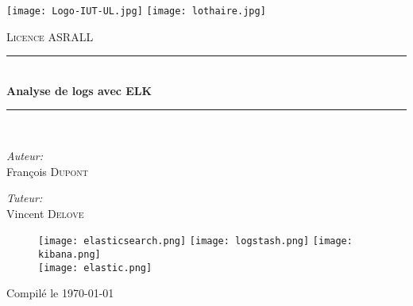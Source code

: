 \begin{titlepage}
\begin{center}
 \newcommand{\HRule}{\rule{\linewidth}{0.5mm}}

\texttt{[image: Logo-IUT-UL.jpg]}\hfill
\texttt{[image: lothaire.jpg]}
\vspace{1cm}

\textsc{\large Licence ASRALL}
\vspace{0.5cm}

\HRule \\[0.4cm]
{ \Large \bfseries Analyse de logs avec ELK\\[0.4cm] }

\HRule \\[1.0cm]

\noindent
\begin{minipage}{0.5\textwidth}
\begin{flushleft} \large
\emph{Auteur:}\\
François \textsc{Dupont}\\
\end{flushleft}
\end{minipage}%
\begin{minipage}{0.5\textwidth}
\begin{flushright} \large
\emph{Tuteur:} \\
Vincent \textsc{Delove}
\end{flushright}
\end{minipage}

%
\vspace{1cm}

\begin{figure}[h]
    \centering
    \texttt{[image: elasticsearch.png]}
    \hfill
    \texttt{[image: logstash.png]}
    \hfill
    \texttt{[image: kibana.png]}
    \\[20mm]
    \texttt{[image: elastic.png]}
\end{figure}

\vspace{3mm}
{Compilé le \today}%

\end{center}
\end{titlepage}
